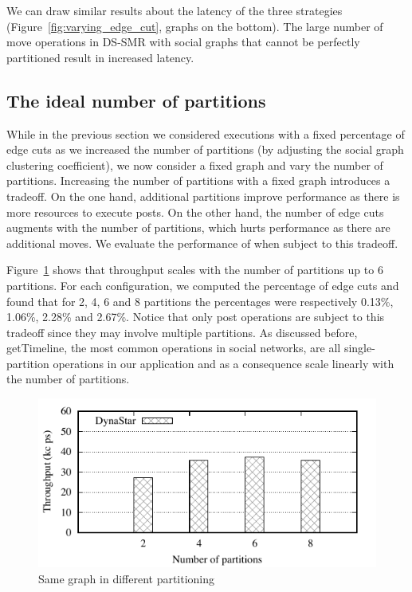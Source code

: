 We can draw similar results about the latency of the three strategies (Figure~\ref{fig:varying_edge_cut}, graphs on the bottom).
The large number of move operations in DS-SMR with social graphs that cannot be perfectly partitioned result in increased latency.


\subsection{The ideal number of partitions}
\label{sec:evaluation:results}

While in the previous section we considered executions with a fixed percentage of edge cuts as we increased the number of partitions (by adjusting the social graph clustering coefficient), we now consider a fixed graph and vary the number of partitions.
Increasing the number of partitions with a fixed graph introduces a tradeoff.
On the one hand, additional partitions improve performance as there is more resources to execute posts.
On the other hand, the number of edge cuts augments with the number of partitions, which hurts performance as there are additional moves.
We evaluate the performance of \dynastar when subject to this tradeoff. 

Figure~\ref{fig:4p1p_varying_partition_size} shows that throughput scales with the number of partitions up to 6 partitions.
For each configuration, we computed the percentage of edge cuts and found that for 2, 4, 6 and 8 partitions the percentages were respectively 
0.13\%, 1.06\%, 2.28\% and 2.67\%.
Notice that only post operations are subject to this tradeoff since they may involve multiple partitions.
As discussed before, getTimeline, the most common operations in social networks, are all single-partition operations in our application and as a consequence scale linearly with the number of partitions.

\begin{figure}[ht]
	\includegraphics{figures/experiments/throughput-avg-vary-partition}
	\caption{Same graph in different partitioning}
	\label{fig:4p1p_varying_partition_size}
\end{figure}


